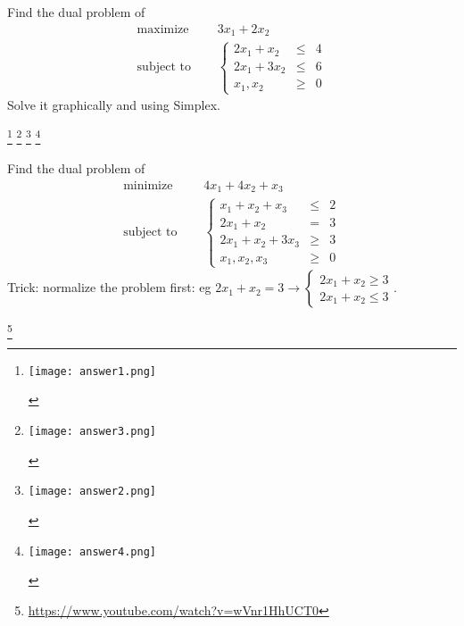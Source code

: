 \begin{Exercise}
  Find the dual problem of
  \begin{equation*}
  \begin{aligned}
    \text{maximize } \quad & 3x_1 +2x_2 \\
    \text{subject to }\quad &
    \left\{
    \begin{array}{rcl}
      2x_1+x_2 &\leq &4 \\
      2x_1+3x_2 &\leq &6 \\
      x_1,x_2 &\geq& 0
    \end{array}
    \right.
  \end{aligned}
\end{equation*}
Solve it graphically and using Simplex. 
\end{Exercise}

\footnote{\begin{center}\texttt{[image: answer1.png]}\end{center}}
\footnote{\begin{center}\texttt{[image: answer3.png]}\end{center}}
\footnote{\begin{center}\texttt{[image: answer2.png]}\end{center}}
\footnote{\begin{center}\texttt{[image: answer4.png]}\end{center}}

\begin{Exercise}
  Find the dual problem of
  \begin{equation*}
  \begin{aligned}
    \text{minimize } \quad & 4x_1 +4x_2+x_3 \\
    \text{subject to }\quad &
    \left\{
    \begin{array}{rcl}
      x_1+x_2+x_3 &\leq &2 \\
      2x_1+x_2 &= &3 \\
      2x_1+x_2+3x_3 &\geq &3 \\
      x_1,x_2,x_3 &\geq& 0
    \end{array}
    \right.
  \end{aligned}
\end{equation*}
Trick: normalize the problem first: eg $2x_1+x_2=3 \rightarrow \begin{cases}2x_1+x_2 \geq 3\\2x_1+x_2\leq 3\end{cases}$.
\end{Exercise}
\footnote{
\url{https://www.youtube.com/watch?v=wVnr1HhUCT0}
}

